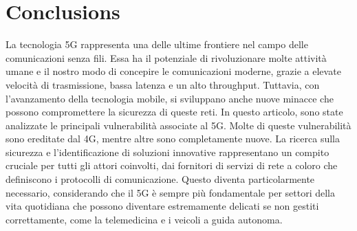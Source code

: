 \documentclass[english]{article}
\begin{document}
\section{Conclusions}
La tecnologia 5G rappresenta una delle ultime frontiere nel campo delle
comunicazioni senza fili. Essa ha il potenziale di rivoluzionare molte attività
umane e il nostro modo di concepire le comunicazioni moderne, grazie a elevate
velocità di trasmissione, bassa latenza e un alto throughput. Tuttavia, con
l'avanzamento della tecnologia mobile, si sviluppano anche nuove minacce che
possono compromettere la sicurezza di queste reti.
In questo articolo, sono state analizzate le principali vulnerabilità associate al
5G. Molte di queste vulnerabilità sono ereditate dal 4G, mentre altre sono
completamente nuove. La ricerca sulla sicurezza e l'identificazione di
soluzioni innovative rappresentano un compito cruciale per tutti gli attori
coinvolti, dai fornitori di servizi di rete a coloro che definiscono i
protocolli di comunicazione. Questo diventa particolarmente necessario,
considerando che il 5G è sempre più fondamentale per settori della vita
quotidiana che possono diventare estremamente delicati se non gestiti
correttamente, come la telemedicina e i veicoli a guida autonoma.
\appendix
\end{document}
